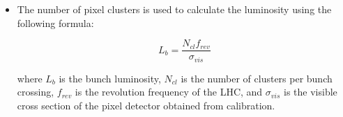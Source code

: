 \begin{itemize}

\item The number of pixel clusters is used to calculate the luminosity using the following formula:

\begin{equation}
 L_b = \frac{N_{cl} f_{rev} } {\sigma_{vis}}   
\end{equation}

where $L_b$ is the bunch luminosity, $N_{cl}$ is the number of clusters per bunch crossing, $f_{rev}$ is the revolution frequency of the LHC, and $\sigma_{vis}$ is the visible cross section of the pixel detector obtained from calibration.

\end{itemize}


